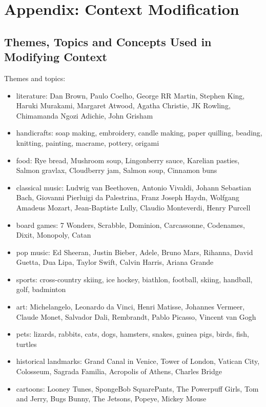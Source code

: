 \documentclass[english, 12pt, a4paper, sci, utf8, a-2b, online]{latex/definitions/aaltothesis}
\begin{document}
\thesisappendix

\section{Appendix: Context Modification} \label{app:mod}

\subsection{Themes, Topics and Concepts Used in Modifying Context} \label{app:context_values}

Themes and topics:
\begin{itemize}
    \item literature: Dan Brown, Paulo Coelho, George RR Martin, Stephen King, Haruki Murakami, Margaret Atwood, Agatha Christie, JK Rowling, Chimamanda Ngozi Adichie, John Grisham
    \item handicrafts: soap making, embroidery, candle making, paper quilling, beading, knitting, painting, macrame, pottery, origami
    \item food: Rye bread, Mushroom soup, Lingonberry sauce, Karelian pasties, Salmon gravlax, Cloudberry jam, Salmon soup, Cinnamon buns
    \item classical music: Ludwig van Beethoven, Antonio Vivaldi, Johann Sebastian Bach, Giovanni Pierluigi da Palestrina, Franz Joseph Haydn, Wolfgang Amadeus Mozart, Jean-Baptiste Lully, Claudio Monteverdi, Henry Purcell
    \item board games: 7 Wonders, Scrabble, Dominion, Carcassonne, Codenames, Dixit, Monopoly, Catan
    \item pop music: Ed Sheeran, Justin Bieber, Adele, Bruno Mars, Rihanna, David Guetta, Dua Lipa, Taylor Swift, Calvin Harris, Ariana Grande
    \item sports: cross-country skiing, ice hockey, biathlon, football, skiing, handball, golf, badminton
    \item art: Michelangelo, Leonardo da Vinci, Henri Matisse, Johannes Vermeer, Claude Monet, Salvador Dali, Rembrandt, Pablo Picasso, Vincent van Gogh
    \item pets: lizards, rabbits, cats, dogs, hamsters, snakes, guinea pigs, birds, fish, turtles
    \item historical landmarks: Grand Canal in Venice, Tower of London, Vatican City, Colosseum, Sagrada Familia, Acropolis of Athens, Charles Bridge
    \item cartoons: Looney Tunes, SpongeBob SquarePants, The Powerpuff Girls, Tom and Jerry, Bugs Bunny, The Jetsons, Popeye, Mickey Mouse

\end{itemize}
\end{document}
